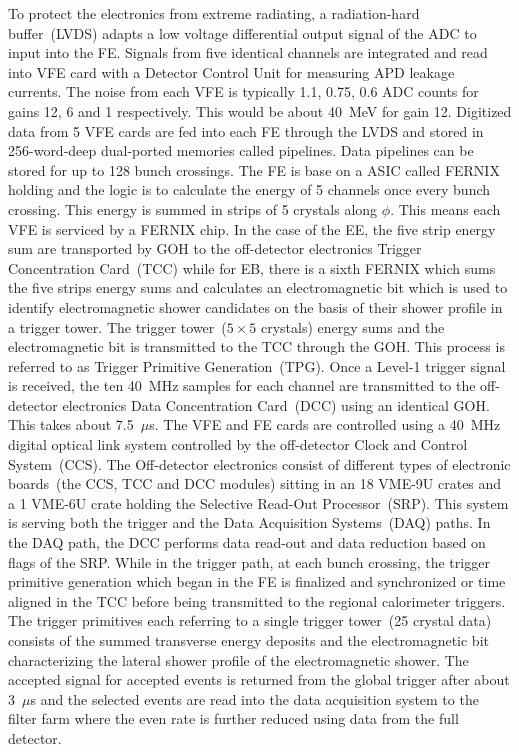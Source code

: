 To protect the electronics from extreme radiating, a radiation-hard buffer~(LVDS) adapts a low voltage differential output signal of the ADC to input into the FE. Signals from  five  identical channels are integrated and read into VFE card with a Detector Control Unit for measuring APD leakage currents. The noise from each VFE is typically 1.1, 0.75, 0.6 ADC counts for gains 12, 6 and 1 respectively. This would be about 40~MeV for gain 12.
Digitized data from 5 VFE cards are fed into each FE through the LVDS and stored in 256-word-deep dual-ported memories called pipelines. Data pipelines can be stored for up to 128 bunch crossings. The FE is base on a ASIC called FERNIX holding and the logic is to calculate the energy of 5 channels once every bunch crossing. This energy is summed in strips of 5 crystals  along $\phi$. This means each VFE is serviced by a FERNIX chip. In the case of the EE, the five strip energy sum are transported by GOH to the off-detector electronics Trigger Concentration Card~(TCC) while for EB, there is a sixth FERNIX which sums the five strips energy sums and calculates an electromagnetic bit which is used to identify electromagnetic shower candidates on the basis of their shower profile in a trigger tower. The trigger tower~($5\times5$ crystals) energy sums and the electromagnetic bit is transmitted to the TCC through the GOH. This process is referred to as Trigger Primitive Generation~(TPG). Once a Level-1 trigger signal is received, the ten 40~MHz samples for each channel are transmitted to the off-detector electronics Data Concentration Card~(DCC) using an identical GOH. This takes about 7.5~$\mu$s. The VFE and FE cards are controlled using a 40~MHz digital optical link system controlled by the off-detector Clock and Control System~(CCS). 
The Off-detector electronics consist of different types of electronic boards~(the CCS, TCC and DCC modules) sitting in an 18 VME-9U crates and a 1 VME-6U crate holding the Selective Read-Out Processor~(SRP). This system is serving both the trigger and the  Data Acquisition Systems~(DAQ) paths. In the DAQ path, the DCC performs data read-out and data reduction based on flags of the SRP. While in the trigger path, at each bunch crossing, the trigger primitive generation which began in the FE is finalized and synchronized or time aligned in the TCC before being transmitted to the regional calorimeter triggers. The trigger primitives each referring to a single trigger tower~(25 crystal data) consists of the summed transverse energy deposits and the electromagnetic bit characterizing the lateral shower profile of the electromagnetic shower. The accepted signal for accepted events is returned from the global trigger after about 3~$\mu$s and the selected events are read into the data acquisition system to the filter farm where the even rate is further reduced using data from the full detector.

